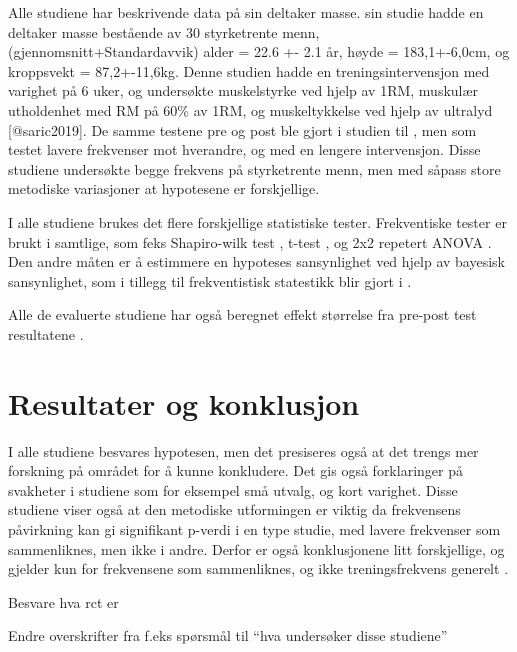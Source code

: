 \documentclass[
]{book}
\begin{document}
Alle studiene har beskrivende data på sin deltaker masse. \citep{saric2019} sin studie hadde en deltaker masse bestående av 30 styrketrente menn, (gjennomsnitt+Standardavvik) alder = 22.6 +- 2.1 år, høyde = 183,1+-6,0cm, og kroppsvekt = 87,2+-11,6kg. Denne studien hadde en treningsintervensjon med varighet på 6 uker, og undersøkte muskelstyrke ved hjelp av 1RM, muskulær utholdenhet med RM på 60\% av 1RM, og muskeltykkelse ved hjelp av ultralyd {[}@saric2019{]}. De samme testene pre og post ble gjort i studien til \citep{brigatto2019}, men som testet lavere frekvenser mot hverandre, og med en lengere intervensjon. Disse studiene undersøkte begge frekvens på styrketrente menn, men med såpass store metodiske variasjoner at hypotesene er forskjellige.

I alle studiene brukes det flere forskjellige statistiske tester. Frekventiske tester er brukt i samtlige, som feks Shapiro-wilk test \citep{brigatto2019, johnsen2021, lasevicius2019}, t-test \citet{brigatto2019}, og 2x2 repetert ANOVA \citep{brigatto2019, johnsen2021} . Den andre måten er å estimmere en hypoteses sansynlighet ved hjelp av bayesisk sansynlighet, som i tillegg til frekventistisk statestikk blir gjort i \citep{saric2019}.

Alle de evaluerte studiene har også beregnet effekt størrelse fra pre-post test resultatene \citep{brigatto2019, gentil2018, johnsen2021, saric2019, lasevicius2019}.

\hypertarget{resultater-og-konklusjon}{%
\section{\texorpdfstring{\textbf{Resultater og konklusjon}}{Resultater og konklusjon}}\label{resultater-og-konklusjon}}

I alle studiene besvares hypotesen, men det presiseres også at det trengs mer forskning på området for å kunne konkludere. Det gis også forklaringer på svakheter i studiene som for eksempel små utvalg, og kort varighet. Disse studiene viser også at den metodiske utformingen er viktig da frekvensens påvirkning kan gi signifikant p-verdi i en type studie, med lavere frekvenser som sammenliknes, men ikke i andre. Derfor er også konklusjonene litt forskjellige, og gjelder kun for frekvensene som sammenliknes, og ikke treningsfrekvens generelt \citep{johnsen2021, brigatto2019, gentil2018, saric2019, lasevicius2019}.

Besvare hva rct er

Endre overskrifter fra f.eks spørsmål til ``hva undersøker disse studiene''
\end{document}
